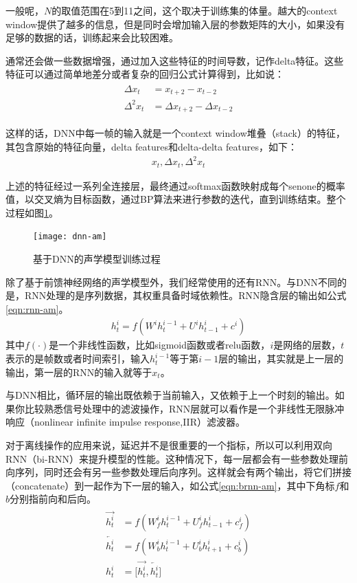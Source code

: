 一般呢，$N$的取值范围在5到11之间，这个取决于训练集的体量。越大的context window提供了越多的信息，但是同时会增加输入层的参数矩阵的大小，如果没有足够的数据的话，训练起来会比较困难。

通常还会做一些数据增强，通过加入这些特征的时间导数，记作delta特征。这些特征可以通过简单地差分或者复杂的回归公式计算得到，比如说：
\begin{align}
\begin{split}
\Delta x_{t} &= x_{t+2} - x_{t-2} \\
\Delta^{2} x_{t} &= \Delta x_{t+2} - \Delta x_{t-2} 
\end{split}
\end{align}

这样的话，DNN中每一帧的输入就是一个context window堆叠（stack）的特征，其包含原始的特征向量，delta features和delta-delta features，如下：
\begin{align} 
	x_{t} , \Delta x_{t}, \Delta^{2} x_{t} 
\end{align}

上述的特征经过一系列全连接层，最终通过softmax函数映射成每个senone的概率值，以交叉熵为目标函数，通过BP算法来进行参数的迭代，直到训练结束。整个过程如图\ref{fig:dnn-am}。
\begin{figure}[htbp]
	\centering
	\texttt{[image: dnn-am]}
	\caption{基于DNN的声学模型训练过程\label{fig:dnn-am}}
\end{figure}

除了基于前馈神经网络的声学模型外，我们经常使用的还有RNN。与DNN不同的是，RNN处理的是序列数据，其权重具备时域依赖性。RNN隐含层的输出如公式\ref{eqn:rnn-am}。
\begin{align} 
\label{eqn:rnn-am}
	h_{t}^{i} = f(W^{i}h_{t}^{i-1} + U^{i}h_{t-1}^{i}+c^{i})
\end{align}
其中$f(\cdot)$是一个非线性函数，比如sigmoid函数或者relu函数，$i$是网络的层数，$t$表示的是帧数或者时间索引，输入$h_{t}^{i-1}$等于第$i-1$层的输出，其实就是上一层的输出，第一层的RNN的输入就等于$x_{t}$。

与DNN相比，循环层的输出既依赖于当前输入，又依赖于上一个时刻的输出。如果你比较熟悉信号处理中的滤波操作，RNN层就可以看作是一个非线性无限脉冲响应（nonlinear infinite impulse response,IIR）滤波器。

对于离线操作的应用来说，延迟并不是很重要的一个指标，所以可以利用双向RNN（bi-RNN）来提升模型的性能。这种情况下，每一层都会有一些参数处理前向序列，同时还会有另一些参数处理后向序列。这样就会有两个输出，将它们拼接（concatenate）到一起作为下一层的输入，如公式\ref{eqn:brnn-am}，其中下角标$f$和$b$分别指前向和后向。
\begin{align}
\label{eqn:brnn-am}
\begin{split}
 \overrightarrow{h_{t}^{i}} &= f(W_{f}^{i}h_{t}^{i-1} + U_{f}^{i}h_{t-1}^{i}+c_{f}^{i}) \\
 \overleftarrow{h_{t}^{i}} &= f(W_{b}^{i}h_{t}^{i-1} + U_{b}^{i}h_{t+1}^{i}+c_{b}^{i}) \\
 h_{t}^{i} &= \Big[\overrightarrow{h_{t}^{i}} , \overleftarrow{h_{t}^{i}} \Big]
\end{split}
\end{align}

